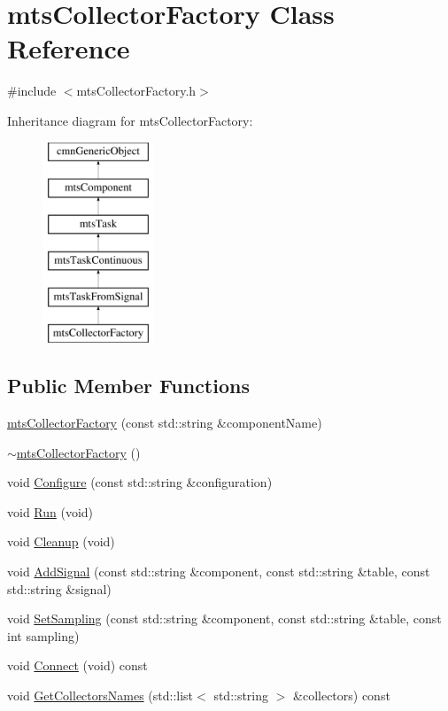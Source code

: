 \hypertarget{classmts_collector_factory}{}\section{mts\+Collector\+Factory Class Reference}
\label{classmts_collector_factory}


{\ttfamily \#include $<$mts\+Collector\+Factory.\+h$>$}

Inheritance diagram for mts\+Collector\+Factory\+:\begin{figure}[H]
\begin{center}
\leavevmode
\includegraphics[height=6.000000cm]{dd/d72/classmts_collector_factory}
\end{center}
\end{figure}
\subsection*{Public Member Functions}
\begin{DoxyCompactItemize}
\item 
\hyperlink{classmts_collector_factory_a2f05af1940cf1262dccd05f274d2883a}{mts\+Collector\+Factory} (const std\+::string \&component\+Name)
\item 
\hyperlink{classmts_collector_factory_af68fd1ba191ef9de8d967a4830b15325}{$\sim$mts\+Collector\+Factory} ()
\item 
void \hyperlink{classmts_collector_factory_a83f9afdf222ce01c87e8708e1f9bbdf7}{Configure} (const std\+::string \&configuration)
\item 
void \hyperlink{classmts_collector_factory_a06d146dcb006904d4a3e7b6522451089}{Run} (void)
\item 
void \hyperlink{classmts_collector_factory_a951a135f4dcc361993a5ed432dafa24b}{Cleanup} (void)
\item 
void \hyperlink{classmts_collector_factory_aed70853447708f6655c49e85d5814381}{Add\+Signal} (const std\+::string \&component, const std\+::string \&table, const std\+::string \&signal)
\item 
void \hyperlink{classmts_collector_factory_a6ffa178e43fb1d9e1cbcc5d63050c956}{Set\+Sampling} (const std\+::string \&component, const std\+::string \&table, const int sampling)
\item 
void \hyperlink{classmts_collector_factory_ab9f06b99a65163c6cd67f27f878bdbb4}{Connect} (void) const 
\item 
void \hyperlink{classmts_collector_factory_a2934fa6732ae2bd36d384f834e00ffdd}{Get\+Collectors\+Names} (std\+::list$<$ std\+::string $>$ \&collectors) const 
\end{DoxyCompactItemize}
